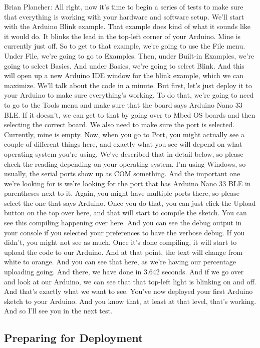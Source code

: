 Brian Plancher: All right, now it's time to begin a series of tests
to make sure that everything is working with your hardware and software setup.
We'll start with the Arduino Blink example.
That example does kind of what it sounds like it would do.
It blinks the lead in the top-left corner of your Arduino.
Mine is currently just off.
So to get to that example, we're going to use the File menu.
Under File, we're going to go to Examples.
Then, under Built-in Examples, we're going to select Basics.
And under Basics, we're going to select Blink.
And this will open up a new Arduino IDE window for the blink
example, which we can maximize.
We'll talk about the code in a minute.
But first, let's just deploy it to your Arduino
to make sure everything's working.
To do that, we're going to need to go to the Tools menu
and make sure that the board says Arduino Nano 33 BLE.
If it doesn't, we can get to that by going over to Mbed OS boards
and then selecting the correct board.
We also need to make sure the port is selected.
Currently, mine is empty.
Now, when you go to Port, you might actually
see a couple of different things here, and exactly what you see
will depend on what operating system you're using.
We've described that in detail below, so please check the reading
depending on your operating system.
I'm using Windows, so usually, the serial ports show up as COM something.
And the important one we're looking for is
we're looking for the port that has Arduino Nano 33
BLE in parentheses next to it.
Again, you might have multiple ports there,
so please select the one that says Arduino.
Once you do that, you can just click the Upload button on the top over here,
and that will start to compile the sketch.
You can see this compiling happening over here.
And you can see the debug output in your console
if you selected your preferences to have the verbose debug.
If you didn't, you might not see as much.
Once it's done compiling, it will start to upload the code to our Arduino.
And at that point, the text will change from white to orange.
And you can see that here, as we're having our percentage uploading going.
And there, we have done in 3.642 seconds.
And if we go over and look at our Arduino,
we can see that that top-left light is blinking on and off.
And that's exactly what we want to see.
You've now deployed your first Arduino sketch to your Arduino.
And you know that, at least at that level, that's working.
And so I'll see you in the next test.

\subsection{Preparing for Deployment}

